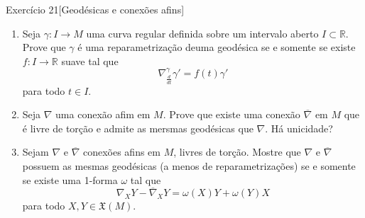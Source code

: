\begin{thing6}{Exercício 21}[Geodésicas e conexões afins]\label{exer:21}\leavevmode
\begin{enumerate}[label=(\alph*)]
\item Seja \(\gamma:I \to M\) uma curva regular definida sobre um intervalo aberto \(I \subset \mathbb{R}\). Prove que \(\gamma\) é uma reparametrização deuma geodésica se e somente se existe \(f:I \to \mathbb{R}\) suave tal que
	\[\nabla_{\frac{d}{dt}}^\gamma \gamma'=f(t)\gamma'\]
	para todo \(t \in I\).
\item Seja \(\nabla\) uma conexão afim em \(M\). Prove que existe uma conexão \(\overline{\nabla}\) em \(M\) que é livre de torção e admite as mersmas geodésicas que \(\nabla\). Há unicidade?
\item Sejam \(\nabla\) e \(\overline{\nabla}\) conexões afins em \(M\), livres de torção. Mostre que \(\nabla\) e \(\overline{\nabla}\) possuem as mesmas geodésicas (a menos de reparametrizações) se e somente se existe uma 1-forma \(\omega\) tal que
	\[\nabla_XY-\overline{\nabla}_XY=\omega(X)Y+\omega(Y)X\]
	para todo \(X,Y \in \mathfrak{X}(M)\).
\end{enumerate}
\end{thing6}


